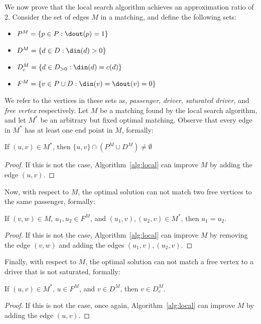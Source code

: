 We now prove that the local search algorithm achieves an approximation ratio of $2$.
Consider the set of edges $M$ in a matching, and define the following sets:
\begin{itemize}
\item $P^M = \{p \in P : \dout(p) = 1\}$
\item $D^M = \{d \in D : \din(d) > 0\}$
\item $D^M_c = \{d \in D_{>0} : \din(d) = c(d)\}$
\item $F^M = \{v \in P \cup D : \din(v) = \dout(v) = 0\}$ 
\end{itemize}

We refer to the vertices in these sets as, \emph{passenger}, 
\emph{driver}, \emph{saturated driver}, and \emph{free vertex} respectively.
Let $M$ be a matching found by the local search algorithm, 
and let $M^*$ be an arbitrary but fixed optimal matching.
Observe that every edge in $M^*$ has at least one end point in $M$, formally: 
\begin{lemma}
If $(u,v) \in M^*$, then $\{u,v\} \cap (P^M \cup D^M) \neq \emptyset$
\end{lemma}

\begin{proof}
If this is not the case, Algorithm~\ref{alg:local} can improve $M$
by adding the edge $(u,v)$.  
\end{proof}

Now, with respect to $M$, the optimal solution can not match two free vertices to the same
passenger, formally:
\begin{lemma}
If $(v,w) \in M$, $u_1, u_2 \in F^M$, and $(u_1, v), (u_2, v) \in M^*$, then $u_1 = u_2$.
\end{lemma}

\begin{proof}
If this is not the case, Algorithm~\ref{alg:local} can improve $M$ 
by removing the edge $(v,w)$ and adding the edges $(u_1, v), (u_2, v)$.
\end{proof}

Finally, with respect to $M$, the optimal solution can not match a free vertex to a driver
that is not saturated, formally: 
\begin{lemma}
If $(u,v) \in M^*$, $u \in F^M$, and $v \in D^M$, then $v \in D^M_c$.
\end{lemma}

\begin{proof}
If this is not the case, once again, Algorithm~\ref{alg:local} can improve $M$
by adding the edge $(u,v)$.
\end{proof}

